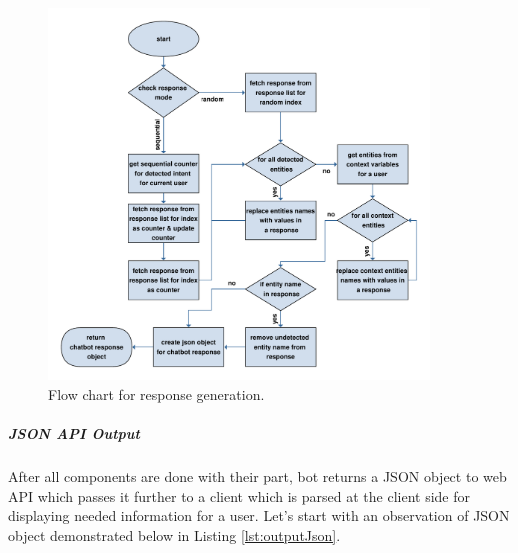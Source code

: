\begin{figure}[H]
    \centering
    \includegraphics[width=0.9\textwidth]{img/Response_generator.pdf}
    \caption{Flow chart for response generation.}
    \label{fig:flowRespGen}
\end{figure}

\subparagraph*{JSON API Output}
After all components are done with their part, bot returns a JSON object to web API which passes it further to a client which is parsed at the client side for displaying needed information for a user. Let's start with an observation of JSON object demonstrated below in Listing \ref{lst:outputJson}.

